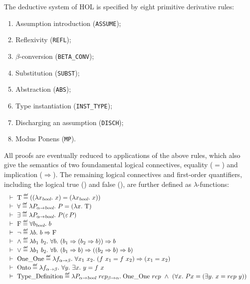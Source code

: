 The deductive system of HOL is specified by eight primitive
derivative rules:
\begin{enumerate}
\item Assumption introduction (\texttt{ASSUME});
\item Reflexivity (\texttt{REFL});
\item $\beta$-conversion (\texttt{BETA\_CONV});
\item Substitution (\texttt{SUBST});
\item Abstraction (\texttt{ABS});
\item Type instantiation (\texttt{INST\_TYPE});
\item Discharging an assumption (\texttt{DISCH});
\item Modus Ponens (\texttt{MP}).
\end{enumerate}
All proofs are eventually reduced to applications of the above rules,
which also give the semantics of two foundamental
logical connectives, equality ($=$) and implication
($\Rightarrow$). The remaining logical connectives and first-order
quantifiers, including the logical true () and false (), are
further defined as $\lambda$-functions: 
\begin{equation*}
\begin{array}{l}
\turn \T \HOLTokenDefEquality ((\lquant{x_{\ty{bool}}}x) =
               (\lquant{x_{\ty{bool}}}x))    \\
\turn \forall \HOLTokenDefEquality \lquant{P_{\alpha\fun\ty{bool}}} P =
                    (\lquant{x}\T ) \\
\turn \exists \HOLTokenDefEquality \lquant{P_{\alpha\fun\ty{bool}}} P({\hilbert}\, P) \\
\turn \F \HOLTokenDefEquality \uquant{b_{\ty{bool}}} b  \\
\turn \neg \HOLTokenDefEquality \lquant{b} b \imp \F \\
\turn {\wedge}  \HOLTokenDefEquality  \lquant{b_1\ b_2}\uquant{b} (b_1\imp (b_2 \imp b)) \imp b \\
\turn {\vee} \HOLTokenDefEquality \lquant{b_1\ b_2}\uquant{b} (b_1 \imp b)\imp ((b_2 \imp b) \imp b) \\
\turn \OneOne \HOLTokenDefEquality \lquant{f_{\alpha \fun\beta}}\uquant{x_1\ x_2}
                    (f\ x_1 = f\ x_2)  \imp (x_1 = x_2) \\
\turn \Onto \HOLTokenDefEquality \lquant{f_{\alpha\fun\beta}}
                  \uquant{y}\equant{x} y = f\ x \\
\turn \TyDef \HOLTokenDefEquality \lambda P_{\alpha\fun\ty{bool}}\
                  rep_{\beta\fun\alpha}.\;
                  \OneOne\ rep \ \wedge{}\  (\uquant{x}P x = (\equant{y} x = rep\ y))
\end{array}
\end{equation*}
